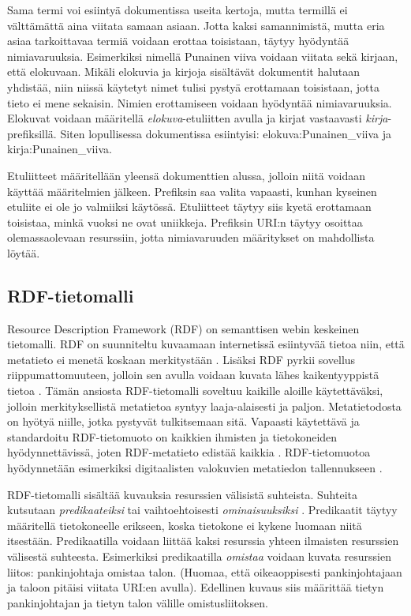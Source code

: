 \documentclass[finnish, 12pt, a4paper, elec, utf8, pdfa, online]{aaltothesis}
\begin{document}
 Sama termi voi esiintyä dokumentissa useita kertoja, mutta termillä ei välttämättä aina viitata samaan asiaan. Jotta kaksi samannimistä, mutta eria asiaa tarkoittavaa termiä voidaan erottaa toisistaan, täytyy hyödyntää nimiavaruuksia. Esimerkiksi nimellä Punainen viiva voidaan viitata sekä kirjaan, että elokuvaan. Mikäli elokuvia ja kirjoja sisältävät dokumentit halutaan yhdistää, niin niissä käytetyt nimet tulisi pystyä erottamaan toisistaan, jotta tieto ei mene sekaisin. Nimien erottamiseen voidaan hyödyntää nimiavaruuksia. Elokuvat voidaan määritellä \textit{elokuva}-etuliitten avulla ja kirjat vastaavasti \textit{kirja}-prefiksillä. Siten lopullisessa dokumentissa esiintyisi: elokuva:Punainen\_viiva ja kirja:Punainen\_viiva.

 Etuliitteet määritellään yleensä dokumenttien alussa, jolloin niitä voidaan käyttää määritelmien jälkeen. Prefiksin saa valita vapaasti, kunhan kyseinen etuliite ei ole jo valmiiksi käytössä. Etuliitteet täytyy siis kyetä erottamaan toisistaa, minkä vuoksi ne ovat uniikkeja. Prefiksin URI:n täytyy osoittaa olemassaolevaan resurssiin, jotta nimiavaruuden määritykset on mahdollista löytää.

\subsection{RDF-tietomalli}
Resource Description Framework (RDF) on semanttisen webin keskeinen tietomalli. RDF on suunniteltu kuvaamaan internetissä esiintyvää tietoa niin, että metatieto ei menetä koskaan merkitystään \cite{RDF_specification}. Lisäksi RDF pyrkii sovellus riippumattomuuteen, jolloin sen avulla voidaan kuvata lähes kaikentyyppistä tietoa \cite{RDF_specification}. Tämän ansiosta RDF-tietomalli soveltuu kaikille aloille käytettäväksi, jolloin merkityksellistä metatietoa syntyy laaja-alaisesti ja paljon. Metatietodosta on hyötyä niille, jotka pystyvät tulkitsemaan sitä. Vapaasti käytettävä ja standardoitu RDF-tietomuoto on kaikkien ihmisten ja tietokoneiden hyödynnettävissä, joten RDF-metatieto edistää kaikkia \cite{metadata}. RDF-tietomuotoa hyödynnetään esimerkiksi digitaalisten valokuvien metatiedon tallennukseen \cite{XMP1} \cite{profium_metadata}.

RDF-tietomalli sisältää kuvauksia resurssien välisistä suhteista. Suhteita kutsutaan \textit{predikaateiksi} tai vaihtoehtoisesti \textit{ominaisuuksiksi} \cite{Antoniou}. Predikaatit täytyy määritellä tietokoneelle erikseen, koska tietokone ei kykene luomaan niitä itsestään. Predikaatilla voidaan liittää kaksi resurssia yhteen ilmaisten resurssien välisestä suhteesta. Esimerkiksi predikaatilla \textit{omistaa} voidaan kuvata resurssien liitos: pankinjohtaja omistaa talon. (Huomaa, että oikeaoppisesti pankinjohtajaan ja taloon pitäisi viitata URI:en avulla). Edellinen kuvaus siis määrittää tietyn pankinjohtajan ja tietyn talon välille omistusliitoksen.
\end{document}
